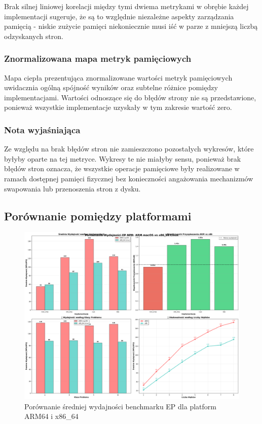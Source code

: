 Brak silnej liniowej korelacji między tymi dwiema metrykami w obrębie każdej implementacji sugeruje, że są to względnie niezależne aspekty zarządzania pamięcią - niskie zużycie pamięci niekoniecznie musi iść w parze z mniejszą liczbą odzyskanych stron.

\subsubsection{Znormalizowana mapa metryk pamięciowych}
Mapa ciepła prezentująca znormalizowane wartości metryk pamięciowych uwidacznia ogólną spójność wyników oraz subtelne różnice pomiędzy implementacjami. Wartości odnoszące się do błędów strony nie są przedstawione, ponieważ wszystkie implementacje uzyskały w tym zakresie wartość zero.

\subsubsection{Nota wyjaśniająca}
Ze względu na brak błędów stron nie zamieszczono pozostałych wykresów, które byłyby oparte na tej metryce. Wykresy te nie miałyby sensu, ponieważ brak błędów stron oznacza, że wszystkie operacje pamięciowe były realizowane w ramach dostępnej pamięci fizycznej bez konieczności angażowania mechanizmów swapowania lub przenoszenia stron z dysku.


\subsection{Porównanie pomiędzy platformami}
\begin{figure}[H]
    \centering
    \includegraphics[width=\textwidth]{analiza/images/parallel/ep/compare/ep_porownanie_platform_arm_vs_x86.png}
    \caption{Porównanie średniej wydajności benchmarku EP dla platform ARM64 i x86\_64}
    \label{ep_porownanie_platform_arm_vs_x86}
\end{figure}
